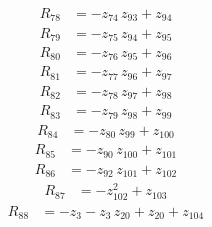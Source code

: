 \begin{equation*}\begin{aligned}
R_{78}&=-z_{74}\,z_{93} +z_{94}
\end{aligned}\end{equation*}
\begin{equation*}\begin{aligned}
R_{79}&=-z_{75}\,z_{94} +z_{95}
\end{aligned}\end{equation*}
\begin{equation*}\begin{aligned}
R_{80}&=-z_{76}\,z_{95} +z_{96}
\end{aligned}\end{equation*}
\begin{equation*}\begin{aligned}
R_{81}&=-z_{77}\,z_{96} +z_{97}
\end{aligned}\end{equation*}
\begin{equation*}\begin{aligned}
R_{82}&=-z_{78}\,z_{97} +z_{98}
\end{aligned}\end{equation*}
\begin{equation*}\begin{aligned}
R_{83}&=-z_{79}\,z_{98} +z_{99}
\end{aligned}\end{equation*}
\begin{equation*}\begin{aligned}
R_{84}&=-z_{80}\,z_{99} +z_{100}
\end{aligned}\end{equation*}
\begin{equation*}\begin{aligned}
R_{85}&=-z_{90}\,z_{100} +z_{101}
\end{aligned}\end{equation*}
\begin{equation*}\begin{aligned}
R_{86}&=-z_{92}\,z_{101} +z_{102}
\end{aligned}\end{equation*}
\begin{equation*}\begin{aligned}
R_{87}&=-z_{102}^{2} +z_{103}
\end{aligned}\end{equation*}
\begin{equation*}\begin{aligned}
R_{88}&=-z_{3} -z_{3}\,z_{20} +z_{20} +z_{104}
\end{aligned}\end{equation*}
